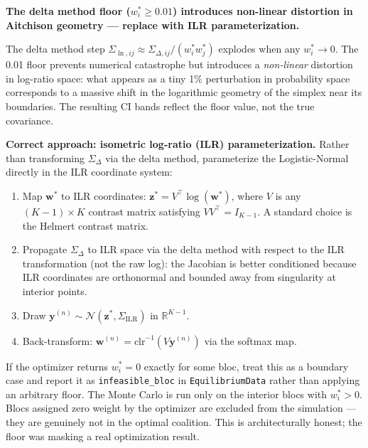 \documentclass[11pt]{article}
\begin{document}
\begin{mdframed}[style=warnbox]
\textbf{The delta method floor ($w_i^* \geq 0.01$) introduces non-linear
distortion in Aitchison geometry --- replace with ILR parameterization.}

The delta method step $\Sigma_{\ln,ij} \approx \Sigma_{\Delta,ij}/(w_i^* w_j^*)$
explodes when any $w_i^* \to 0$. The 0.01 floor prevents numerical catastrophe
but introduces a \emph{non-linear} distortion in log-ratio space: what appears
as a tiny 1\% perturbation in probability space corresponds to a massive shift
in the logarithmic geometry of the simplex near its boundaries. The resulting
CI bands reflect the floor value, not the true covariance.

\textbf{Correct approach: isometric log-ratio (ILR) parameterization.}
Rather than transforming $\Sigma_\Delta$ via the delta method, parameterize the
Logistic-Normal directly in the ILR coordinate system:
\begin{enumerate}[leftmargin=1.8em, itemsep=2pt]
  \item Map $\mathbf{w}^*$ to ILR coordinates:
        $\mathbf{z}^* = V^\top \log(\mathbf{w}^*)$, where $V$ is any
        $(K-1) \times K$ contrast matrix satisfying $V V^\top = I_{K-1}$.
        A standard choice is the Helmert contrast matrix.
  \item Propagate $\Sigma_\Delta$ to ILR space via the delta method with respect
        to the ILR transformation (not the raw log): the Jacobian is better
        conditioned because ILR coordinates are orthonormal and bounded away from
        singularity at interior points.
  \item Draw $\mathbf{y}^{(n)} \sim \mathcal{N}(\mathbf{z}^*, \Sigma_{\text{ILR}})$
        in $\mathbb{R}^{K-1}$.
  \item Back-transform: $\mathbf{w}^{(n)} = \text{clr}^{-1}(V \mathbf{y}^{(n)})$
        via the softmax map.
\end{enumerate}
If the optimizer returns $w_i^* = 0$ exactly for some bloc, treat this as a
boundary case and report it as \texttt{infeasible\_bloc} in \texttt{EquilibriumData}
rather than applying an arbitrary floor. The Monte Carlo is run only on the
interior blocs with $w_i^* > 0$. Blocs assigned zero weight by the optimizer are
excluded from the simulation --- they are genuinely not in the optimal coalition.
This is architecturally honest; the floor was masking a real optimization result.
\end{mdframed}
\end{document}
